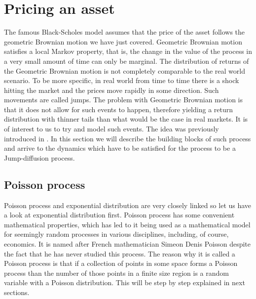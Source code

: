 \documentclass[times, utf8, diplomski]{fer}
\begin{document}
\chapter{Pricing an asset}


The famous Black-Scholes model assumes that the price of the asset follows the geometric Brownian motion we have just covered. Geometric Brownian motion satisfies a local Markov property, that is, the change in the value of the process in a very small amount of time can only be marginal. The distribution of returns of the Geometric Brownian motion is not completely comparable to the real world scenario. To be more specific, in real world from time to time there is a shock hitting the market and the prices move rapidly in some direction. Such movements are called jumps. The problem with Geometric Brownian motion is that it does not allow for such events to happen, therefore yielding a return distribution with thinner tails than what would be the case in real markets. It is of interest to us to try and model such events. The idea was previously introduced in \cite{merton_option_1976}. In this section we will describe the building blocks of such process and arrive to the dynamics which have to be satisfied for the process to be a Jump-diffusion process.

	\section{Poisson process}
	Poisson process and exponential distribution are very closely linked so let us have a look at exponential distribution first. Poisson process has some convenient mathematical properties, which has led to it being used as a mathematical model for seemingly random processes in various disciplines, including, of course, economics. It is named after French mathematician Simeon Denis Poisson despite the fact that he has never studied this process. The reason why it is called a Poisson process is that if a collection of points in some space forms a Poisson process than the number of those points in a finite size region is a random variable with a Poisson distribution. This will be step by step explained in next sections.
\end{document}
